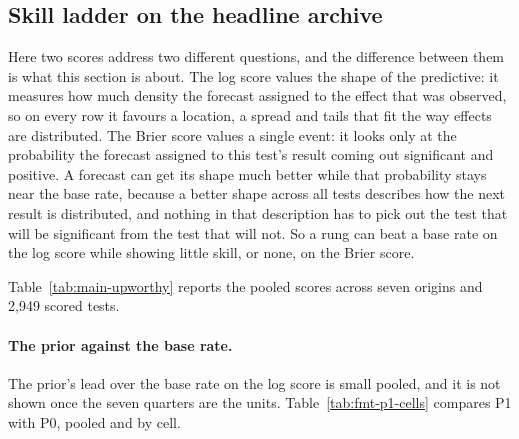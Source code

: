 \subsection{Skill ladder on the headline archive}
\label{sec:ladder-results}
Here two scores address two different questions, and the difference between them is what this section is about. The log score values the shape of the predictive: it measures how much density the forecast assigned to the effect that was observed, so on every row it favours a location, a spread and tails that fit the way effects are distributed. The Brier score values a single event: it looks only at the probability the forecast assigned to this test's result coming out significant and positive. A forecast can get its shape much better while that probability stays near the base rate, because a better shape across all tests describes how the next result is distributed, and nothing in that description has to pick out the test that will be significant from the test that will not. So a rung can beat a base rate on the log score while showing little skill, or none, on the Brier score.

Table~\ref{tab:main-upworthy} reports the pooled scores across seven origins and 2,949 scored tests.

\paragraph{The prior against the base rate.}
The prior's lead over the base rate on the log score is small pooled, and it is not shown once the seven quarters are the units. Table~\ref{tab:fmt-p1-cells} compares P1 with P0, pooled and by cell.

\begin{table}[t]\centering\scriptsize
\caption{P1 against P0 on the headline archive in the main run, pooled and by cell. Columns: scored tests, the log score per row of each rung, their paired difference with its 90 percent bootstrap interval by test, which holds the fitted models and the set of quarters fixed, P1's Brier skill against the base rate, and the interval for that skill adjusted for the 52 intervals of the aggregate table (Table~\ref{tab:main-upworthy}). The last row repeats the pooled difference with a Student-t interval on the seven quarterly means, with the seven quarters as the units. A test with contrasts in two cells is counted in both, so the cells add up to more than the pooled count. The pooled log score difference and the pooled Brier skill agree at every printed decimal by coincidence, and they are different quantities.}
\label{tab:fmt-p1-cells}
\resizebox{\columnwidth}{!}{%
}
\end{table}

